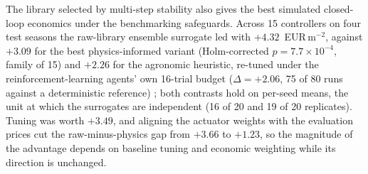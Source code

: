 The library selected by multi-step stability also gives the best
simulated closed-loop economics under the benchmarking safeguards. Across
15 controllers on four test seasons the raw-library ensemble surrogate
\cite{fasel2022} led with $+4.32$~EUR\,m$^{-2}$, against $+3.09$ for the best
physics-informed variant (Holm-corrected $p=7.7\times10^{-4}$, family of 15) and
$+2.26$ for the agronomic heuristic, re-tuned under the reinforcement-learning
agents' own 16-trial budget ($\Delta=+2.06$, 75 of 80 runs against a
deterministic reference) \cite{wilcoxon1945,holm1979}; both contrasts hold on per-seed
means, the unit at which the surrogates are independent (16 of 20 and 19 of 20
replicates). Tuning was worth $+3.49$,
and aligning the actuator weights with the evaluation prices cut the raw-minus-physics
gap from $+3.66$ to $+1.23$, so the magnitude of the advantage depends on baseline
tuning and economic weighting while its direction is unchanged.

